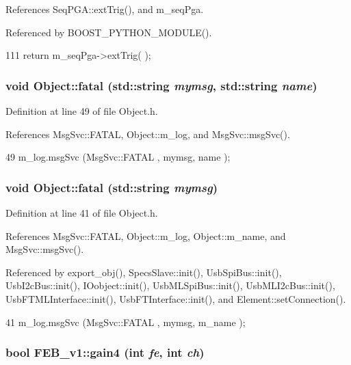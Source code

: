 References SeqPGA::extTrig(), and m\_\-seqPga.

Referenced by BOOST\_\-PYTHON\_\-MODULE().


\begin{DoxyCode}
111 { return m_seqPga->extTrig( ); }
\end{DoxyCode}
\hypertarget{classObject_ae62acd3d09f716220f75f252dc38bc9a}{
\subsubsection[{fatal}]{\setlength{\rightskip}{0pt plus 5cm}void Object::fatal (std::string {\em mymsg}, \/  std::string {\em name})}}
\label{classObject_ae62acd3d09f716220f75f252dc38bc9a}


Definition at line 49 of file Object.h.

References MsgSvc::FATAL, Object::m\_\-log, and MsgSvc::msgSvc().


\begin{DoxyCode}
49 { m_log.msgSvc (MsgSvc::FATAL   , mymsg, name ); }
\end{DoxyCode}
\hypertarget{classObject_aad5a16aac7516ce65bd5ec02ab07fc80}{
\subsubsection[{fatal}]{\setlength{\rightskip}{0pt plus 5cm}void Object::fatal (std::string {\em mymsg})}}
\label{classObject_aad5a16aac7516ce65bd5ec02ab07fc80}


Definition at line 41 of file Object.h.

References MsgSvc::FATAL, Object::m\_\-log, Object::m\_\-name, and MsgSvc::msgSvc().

Referenced by export\_\-obj(), SpecsSlave::init(), UsbSpiBus::init(), UsbI2cBus::init(), IOobject::init(), UsbMLSpiBus::init(), UsbMLI2cBus::init(), UsbFTMLInterface::init(), UsbFTInterface::init(), and Element::setConnection().


\begin{DoxyCode}
41 { m_log.msgSvc (MsgSvc::FATAL   , mymsg, m_name ); }
\end{DoxyCode}
\hypertarget{classFEB__v1_a6b05c21a70fbb2e88f8e1f991a117b49}{
\subsubsection[{gain4}]{\setlength{\rightskip}{0pt plus 5cm}bool FEB\_\-v1::gain4 (int {\em fe}, \/  int {\em ch})}}
\label{classFEB__v1_a6b05c21a70fbb2e88f8e1f991a117b49}


